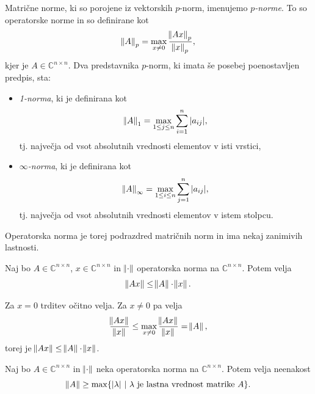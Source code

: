 \documentclass[mat1]{fmfdelo}
\newcommand{\C}{\mathbb C}
\begin{document}
\begin{zgled}
    Matrične norme, ki so porojene iz vektorskih $p$-norm, imenujemo \emph{$p$-norme}. To so operatorske norme in so definirane kot
    \begin{equation*}
        \norm{A}_p = \max_{x \neq 0} \frac{\norm{A x}_p}{\norm{x}_p},
    \end{equation*}
    kjer je $A \in \C^{n\times n}$. Dva predstavnika $p$-norm, ki imata še posebej poenostavljen predpis, sta:
    \begin{itemize}
        \item \emph{1-norma}, ki je definirana kot
        \begin{equation*}
            \norm{A}_1 = \max_{1 \leq j \leq n} \sum_{i=1}^n |a_{ij}|,
        \end{equation*}
        tj. največja od vsot absolutnih vrednosti elementov v isti vrstici,
        \item \emph{$\infty$-norma}, ki je definirana kot
        \begin{equation*}
            \norm{A}_\infty = \max_{1 \leq i \leq n} \sum_{j=1}^n |a_{ij}|,
        \end{equation*}
        tj. največja od vsot absolutnih vrednosti elementov v istem stolpcu.
    \end{itemize}
\end{zgled}
Operatorska norma je torej podrazdred matričnih norm in ima nekaj zanimivih lastnosti.
\begin{trditev}\label{trditevOperatorska}
    Naj bo $A \in \C^{n \times n}$, $x \in \C^{n \times n}$ in $\norm{\cdot}$ operatorska norma na $\C^{n \times n}$. Potem velja
    \begin{equation*}
        \norm{A x} \leq \norm{A} \cdot \norm{x}.
    \end{equation*}
\end{trditev}
\begin{dokaz}
    Za $x = 0$ trditev očitno velja. Za $x \neq 0$ pa velja
    \begin{equation*}
        \frac{\norm{A x}}{\norm{x}} \leq \max_{x \neq 0} \frac{\norm{A x}}{\norm{x}} = \norm{A},
    \end{equation*}
    torej je $\norm{A x} \leq \norm{A} \cdot \norm{x}$.
\end{dokaz}
\begin{posledica}\label{posledicaOperatorskaNorma}
    Naj bo $A \in \C^{n \times n}$ in $\norm{\cdot}$ neka operatorska norma na $\C^{n \times n}$. Potem velja neenakost
    \begin{equation*}
        \norm{A} \geq \max\{|\lambda|\ |\ \lambda\  \text{je lastna vrednost matrike}\  A\}.
    \end{equation*}
\end{posledica}
\end{document}
